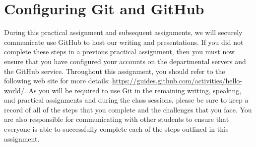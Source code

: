 \section*{Configuring Git and GitHub}

During this practical assignment and subsequent assignments, we will securely communicate use GitHub to host our writing
and presentations. If you did not complete these steps in a previous practical assignment, then you must now ensure that
you have configured your accounts on the departmental servers and the GitHub service. Throughout this assignment, you
should refer to the following web site for more details: \url{https://guides.github.com/activities/hello-world/}. As you
will be required to use Git in the remaining writing, speaking, and practical assignments and during the class sessions,
please be sure to keep a record of all of the steps that you complete and the challenges that you face. You are also
responsible for communicating with other students to ensure that everyone is able to successfully complete each of the
steps outlined in this assignment.

